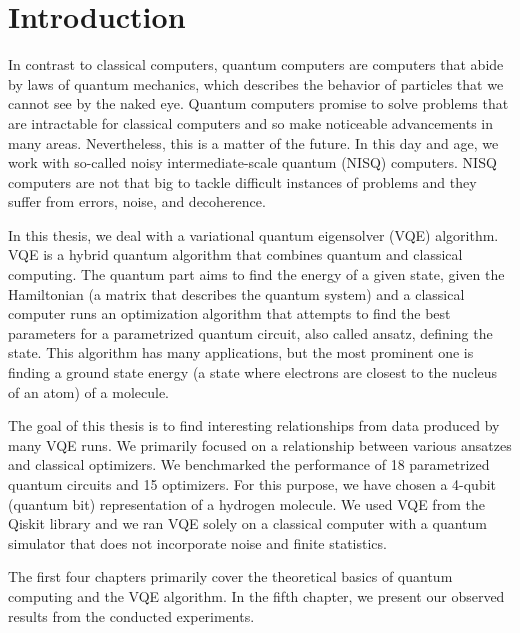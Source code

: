 \chapter*{Introduction}

In contrast to classical computers, quantum computers are computers that abide by laws of quantum mechanics, which describes the behavior of particles that we cannot see by the naked eye. Quantum computers promise to solve problems that are intractable for classical computers \cite{Peruzzo} and so make noticeable advancements in many areas. Nevertheless, this is a matter of the future. In this day and age, we work with so-called noisy intermediate-scale quantum (NISQ) computers. NISQ computers are not that big to tackle difficult instances of problems and they suffer from errors, noise, and decoherence.

In this thesis, we deal with a variational quantum eigensolver (VQE) algorithm. VQE is a hybrid quantum algorithm that combines quantum and classical computing. The quantum part aims to find the energy of a given state, given the Hamiltonian (a matrix that describes the quantum system) and a classical computer runs an optimization algorithm that attempts to find the best parameters for a parametrized quantum circuit, also called ansatz, defining the state. This algorithm has many applications, but the most prominent one is finding a ground state energy (a state where electrons are closest to the nucleus of an atom) of a molecule.

The goal of this thesis is to find interesting relationships from data produced by many VQE runs. We primarily focused on a relationship between various ansatzes and classical optimizers. We benchmarked the performance of 18 parametrized quantum circuits and 15 optimizers. For this purpose, we have chosen a 4-qubit (quantum bit) representation of a hydrogen molecule. We used VQE from the Qiskit library and we ran VQE solely on a classical computer with a quantum simulator that does not incorporate noise and finite statistics.


The first four chapters primarily cover the theoretical basics of quantum computing and the VQE algorithm. In the fifth chapter, we present our observed results from the conducted experiments.



